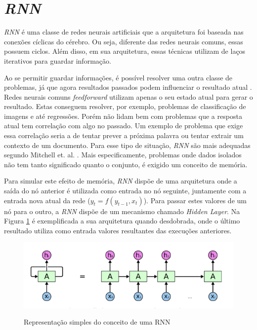 
\section{\textit{\acrfull{RNN}}}

\textit{\acrshort{RNN}} é uma classe de redes neurais artificiais que a arquitetura foi baseada nas conexões cíclicas do cérebro. Ou seja, diferente das redes neurais comuns, essas possuem ciclos. Além disso, em sua arquitetura, essas técnicas utilizam de laços iterativos para guardar informação. \cite{alex2012} 

Ao se permitir guardar informações, é possível resolver uma outra classe de problemas, já que agora resultados passados podem influenciar o resultado atual \cite{alex2012}. Redes neurais comuns \textit{feedforward} utilizam apenas o seu estado atual para gerar o resultado. Estas conseguem resolver, por exemplo, problemas de classificação de imagens e até regressões. Porém não lidam bem com problemas que a resposta atual tem correlação com algo no passado. Um exemplo de problema que exige essa correlação seria a de tentar prever a próxima palavra ou tentar extrair um contexto de um documento. Para esse tipo de situação, \textit{\acrshort{RNN}} são mais adequadas segundo Mitchell et. al. \cite{Mitchell_1997}. Mais especificamente, problemas onde dados isolados não tem tanto significado quanto o conjunto, é exigido um conceito de memória.

Para simular este efeito de memória, \textit{\acrshort{RNN}} dispõe de uma arquitetura onde a saída do nó anterior é utilizada como entrada no nó seguinte, juntamente com a entrada nova atual da rede (\(y_t = f(y_{t-1}, x_t)\)). Para passar estes valores de um nó para o outro, a \textit{\acrshort{RNN}} dispõe de um mecanismo chamado \textit{Hidden Layer}. Na Figura \ref{figure:rnn} é exemplificada a sua arquitetura quando desdobrada, onde o último resultado utiliza como entrada valores resultantes das execuções anteriores.

\begin{figure}[htbp]
    \centering
    \includegraphics[scale=0.4]{monography/img/models/rnnExample.png}
    \label{figure:rnn}
    \caption[Representação simples do conceito de um RNN]{Representação simples do conceito de uma RNN \footnotemark}
\end{figure}

